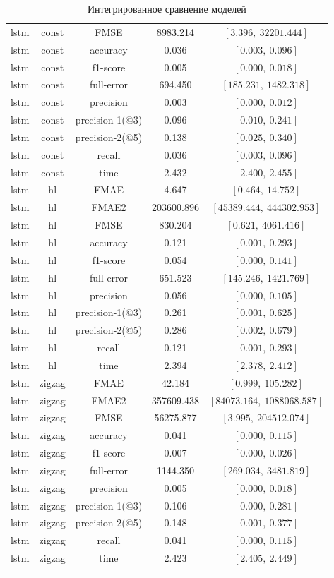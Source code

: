 \begin{center}
\begin{longtable}{|c|c|c|c|c|}
lstm & const & FMSE & 8983.214 & $[3.396,\ 32201.444]$ \\
lstm & const & accuracy & 0.036 & $[0.003,\ 0.096]$ \\
lstm & const & f1-score & 0.005 & $[0.000,\ 0.018]$ \\
lstm & const & full-error & 694.450 & $[185.231,\ 1482.318]$ \\
lstm & const & precision & 0.003 & $[0.000,\ 0.012]$ \\
lstm & const & precision-1(@3) & 0.096 & $[0.010,\ 0.241]$ \\
lstm & const & precision-2(@5) & 0.138 & $[0.025,\ 0.340]$ \\
lstm & const & recall & 0.036 & $[0.003,\ 0.096]$ \\
lstm & const & time & 2.432 & $[2.400,\ 2.455]$ \\
\hline
lstm & hl & FMAE & 4.647 & $[0.464,\ 14.752]$ \\
lstm & hl & FMAE2 & 203600.896 & $[45389.444,\ 444302.953]$ \\
lstm & hl & FMSE & 830.204 & $[0.621,\ 4061.416]$ \\
lstm & hl & accuracy & 0.121 & $[0.001,\ 0.293]$ \\
lstm & hl & f1-score & 0.054 & $[0.000,\ 0.141]$ \\
lstm & hl & full-error & 651.523 & $[145.246,\ 1421.769]$ \\
lstm & hl & precision & 0.056 & $[0.000,\ 0.105]$ \\
lstm & hl & precision-1(@3) & 0.261 & $[0.001,\ 0.625]$ \\
lstm & hl & precision-2(@5) & 0.286 & $[0.002,\ 0.679]$ \\
lstm & hl & recall & 0.121 & $[0.001,\ 0.293]$ \\
lstm & hl & time & 2.394 & $[2.378,\ 2.412]$ \\
\hline
lstm & zigzag & FMAE & 42.184 & $[0.999,\ 105.282]$ \\
lstm & zigzag & FMAE2 & 357609.438 & $[84073.164,\ 1088068.587]$ \\
lstm & zigzag & FMSE & 56275.877 & $[3.995,\ 204512.074]$ \\
lstm & zigzag & accuracy & 0.041 & $[0.000,\ 0.115]$ \\
lstm & zigzag & f1-score & 0.007 & $[0.000,\ 0.026]$ \\
lstm & zigzag & full-error & 1144.350 & $[269.034,\ 3481.819]$ \\
lstm & zigzag & precision & 0.005 & $[0.000,\ 0.018]$ \\
lstm & zigzag & precision-1(@3) & 0.106 & $[0.000,\ 0.281]$ \\
lstm & zigzag & precision-2(@5) & 0.148 & $[0.001,\ 0.377]$ \\
lstm & zigzag & recall & 0.041 & $[0.000,\ 0.115]$ \\
lstm & zigzag & time & 2.423 & $[2.405,\ 2.449]$ \\
\hline
\caption{Интегрированное сравнение моделей}
\label{{ris:total_int}}
\end{longtable}
\end{center}

